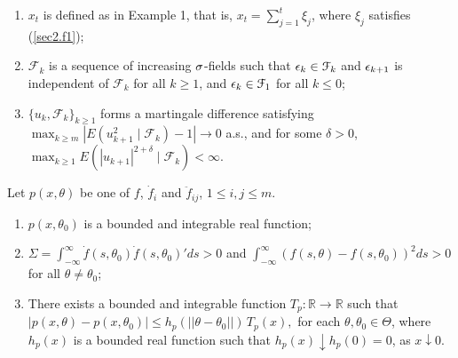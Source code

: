 \begin{assump}
\begin{enumerate}[label=(\roman{*}), leftmargin=*, widest=0] \itemsep0pt \parskip0pt 
	\item $x_t$ is defined as in Example 1, that is, $x_t=\sum_{j=1}^t\xi_j$, where $\xi_j$ satisfies (\ref {sec2.f1});
	\item $\mathcal F_k$ is a sequence of  increasing $\sigma$-fields such that
	$\epsilon_k\in \mathcal F_k$ and $\epsilon_{k+1}$ is independent of $\mathcal F_k$ for all $k\ge 1$, and $\epsilon_k\in \mathcal F_1$ for all $k\le 0$;
	\item $\{u_k, \mathcal F_k\}_{k\ge 1}$
	forms a martingale difference satisfying $ \max_{k\ge m}|E(u_{k+1}^2\mid \mathcal F_{k})-1|\to 0$  a.s., and for some $\delta>0$, $ \max_{k\ge 1 } E(|u_{k+1}|^{2+\delta}\mid \mathcal F_{ k})<\infty. $
\end{enumerate}
\end{assump}


\begin{assump}  Let $p(x, \theta)$ be one of $f$, $\dot{f}_i$ and $\ddot{f}_{ij}$, $1\le i,j\le m$.
\begin{enumerate}[label=(\roman{*}), leftmargin=*, widest=0] \itemsep0pt \parskip0pt 
	\item $p(x, \theta_0)$ is a bounded and integrable real function;
	\item $\Sigma = \int_{-\infty}^{\infty} \dot{f}(s, \theta_0) \dot{f}(s, \theta_0)' ds>0$ and $ \int_{-\infty}^{\infty} (f(s, \theta) - f(s, \theta_0))^2 ds>0$ for all $\theta\not=\theta_0$;
	\item There exists a bounded and integrable function $T_p:\mathbb{R} \rightarrow \mathbb{R}$ such that
$
|p(x, \theta) - p(x, \theta_0)| \le h_p(||\theta - \theta_0||) \,T_p(x),
 $
for each $\theta,\theta_0 \in \Theta$, where $h_p(x)$ is a bounded real function such that $h_p(x)\downarrow h_p(0)=0$, as $x\downarrow 0.$
 \end{enumerate}
\end{assump}



